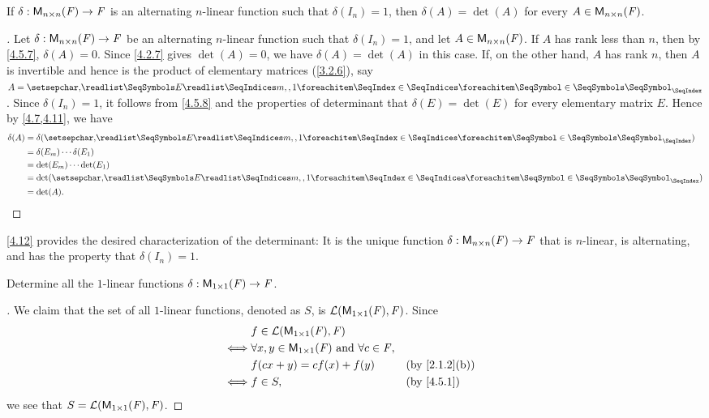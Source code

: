 \begin{thm}\label{4.12}
  If \(\delta : \mathsf{M}_{{n} \times n}({\mathit{F}}) \to \mathit{F}\) is an alternating \(n\)-linear function such that \(\delta(I_n) = 1\), then \(\delta(A) = \det(A)\) for every \(A \in \mathsf{M}_{{n} \times n}({\mathit{F}})\).
\end{thm}

\begin{proof}[]
  Let \(\delta : \mathsf{M}_{{n} \times n}({\mathit{F}}) \to \mathit{F}\) be an alternating \(n\)-linear function such that \(\delta(I_n) = 1\), and let \(A \in \mathsf{M}_{{n} \times n}({\mathit{F}})\).
  If \(A\) has rank less than \(n\), then by \cref{4.5.7}, \(\delta(A) = 0\).
  Since \cref{4.2.7} gives \(\det(A) = 0\), we have \(\delta(A) = \det(A)\) in this case.
  If, on the other hand, \(A\) has rank \(n\), then \(A\) is invertible and hence is the product of elementary matrices (\cref{3.2.6}), say \(A = \seq[]{E}{m,,1}\).
  Since \(\delta(I_n) = 1\), it follows from \cref{4.5.8} and the properties of determinant that \(\delta(E) = \det(E)\) for every elementary matrix \(E\).
  Hence by \cref{4.7,4.11}, we have
  \begin{align*}
    \delta(A) & = \delta(\seq[]{E}{m,,1})        \\
              & = \delta(E_m) \cdots \delta(E_1) \\
              & = \det(E_m) \cdots \det(E_1)     \\
              & = \det(\seq[]{E}{m,,1})          \\
              & = \det(A).
  \end{align*}
\end{proof}

\begin{note}
  \cref{4.12} provides the desired characterization of the determinant:
  It is the unique function \(\delta : \mathsf{M}_{{n} \times n}({\mathit{F}}) \to \mathit{F}\) that is \(n\)-linear, is alternating, and has the property that \(\delta(I_n) = 1\).
\end{note}

\exercisesection

\setcounter{ex}{1}
\begin{ex}\label{ex:4.5.2}
  Determine all the \(1\)-linear functions \(\delta : \mathsf{M}_{{1} \times 1}({\mathit{F}}) \to \mathit{F}\).
\end{ex}

\begin{proof}[]
  We claim that the set of all \(1\)-linear functions, denoted as \(S\), is \(\mathcal{L}(\mathsf{M}_{{1} \times 1}({\mathit{F}}), \mathit{F})\).
  Since
  \begin{align*}
         & f \in \ls(\ms{1}{1}{\F}, \F)                                                                   \\
    \iff & \forall x, y \in \ms{1}{1}{\F} \text{ and } \forall c \in \F,                                  \\
         & f(cx + y) = cf(x) + f(y)                                      &  & \text{(by \cref{2.1.2}(b))} \\
    \iff & f \in S,                                                      &  & \text{(by \cref{4.5.1})}
  \end{align*}
  we see that \(S = \mathcal{L}(\mathsf{M}_{{1} \times 1}({\mathit{F}}), \mathit{F})\).
\end{proof}

